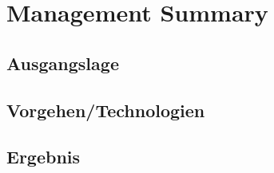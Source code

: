 \chapter*{Management Summary}
\section*{Ausgangslage}
\section*{Vorgehen/Technologien}
\section*{Ergebnis}